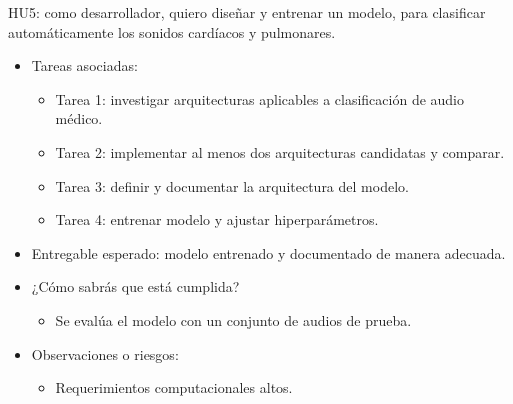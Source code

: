 \documentclass[
11pt, %
]{charter}
\begin{document}
HU5: como desarrollador, quiero diseñar y entrenar un modelo, para clasificar automáticamente los sonidos cardíacos y pulmonares.
\begin{itemize}
  \item Tareas asociadas:
    \begin{itemize}
      \item Tarea 1: investigar arquitecturas aplicables a clasificación de audio médico.
      \item Tarea 2: implementar al menos dos arquitecturas candidatas y comparar.
      \item Tarea 3: definir y documentar la arquitectura del modelo.
      \item Tarea 4: entrenar modelo y ajustar hiperparámetros.
    \end{itemize}
  \item Entregable esperado: modelo entrenado y documentado de manera adecuada.
  \item ¿Cómo sabrás que está cumplida?
    \begin{itemize}
      \item Se evalúa el modelo con un conjunto de audios de prueba.
    \end{itemize}
  \item Observaciones o riesgos:
    \begin{itemize}
      \item Requerimientos computacionales altos.
    \end{itemize}
\end{itemize}
\end{document}
